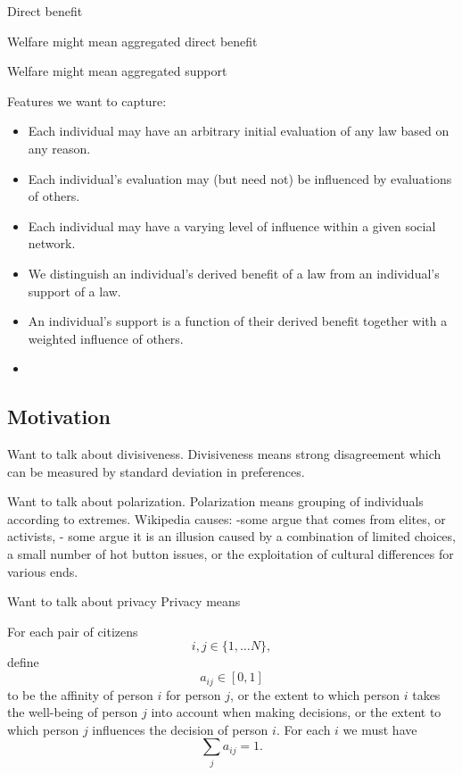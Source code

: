Direct benefit

Welfare might mean aggregated direct benefit

Welfare might mean aggregated support


Features we want to capture:

\begin{itemize}
\item Each individual may have an arbitrary initial evaluation of any law based on any reason.
\item Each individual's evaluation may (but need not) be influenced by evaluations of others.
\item Each individual may have a varying level of influence within a given social network.
\item We distinguish an individual's derived benefit of a law from an individual's support of a law. 
\item An individual's support is a function of their derived benefit together with a weighted influence of others. %
\item 
\end{itemize}

\subsection{Motivation}
Want to talk about divisiveness.
Divisiveness means strong disagreement which can be measured by standard deviation in preferences.

Want to talk about polarization.
Polarization means grouping of individuals according to extremes.
Wikipedia causes: 
-some argue that comes from elites, or activists,
- some argue it is an illusion caused by a combination of limited choices, a small number of hot button issues, or the exploitation of cultural differences for various ends.

Want to talk about privacy
Privacy means

For each pair of citizens $$i,j\in\{1,\dots N\},$$ define $$a_{ij}\in [0,1]$$ to be the affinity of person $i$ for person $j$, or the extent to which person $i$ takes the well-being of person $j$ into account when making decisions, or the extent to which person $j$ influences the decision of person $i$. For each $i$ we must have $$\sum_ja_{ij}=1.$$%

